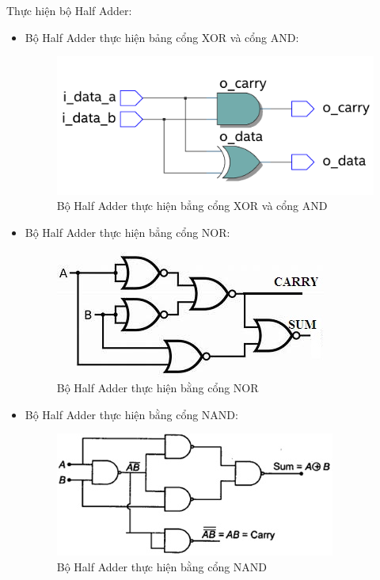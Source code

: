 Thực hiện bộ Half Adder:
\begin{itemize}[label = -]
	\item Bộ Half Adder thực hiện bảng cổng XOR và cổng AND:
	\begin{figure}[H]
		\centering
		\includegraphics[width = 0.5\linewidth]{./image/half_adder_xor_and.png}
		\caption{Bộ Half Adder thực hiện bẳng cổng XOR và cổng AND}
		\label{f_half adder with xor and and}
	\end{figure}
	
	
	\item Bộ Half Adder thực hiện bẳng cổng NOR:
	\begin{figure}[H]
		\centering
		\includegraphics[width = .5\linewidth]{./image/Half-Adder-using-NOR-gates.jpg}
		\caption{Bộ Half Adder thực hiện bằng cổng NOR}
		\label{f_half adder with nor}
	\end{figure}
	
	
	\item Bộ Half Adder thực hiện bằng cổng NAND:
	\begin{figure}[H]
		\centering
		\includegraphics[width = 0.5\linewidth]{./image/Half-Adder-NAND-gates.jpg}
		\caption{Bộ Half Adder thực hiện bằng cổng NAND}
		\label{f_half adder with nand}
		
		
	\end{figure}
\end{itemize}

